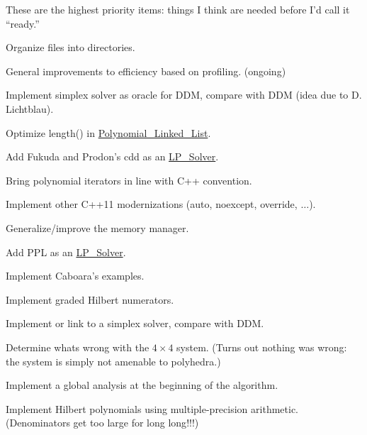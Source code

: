 
\begin{DoxyRefList}
\item[\label{todo__todo000001}%
\Hypertarget{todo__todo000001}%
page \hyperlink{index}{Dyn\+GB\+: Dynamic Gr\"{o}bner basis project files} ]These are the highest priority items\+: things I think are needed before I'd call it ``ready.''
\begin{DoxyItemize}
\item Organize files into directories.
\item General improvements to efficiency based on profiling. (ongoing)
\item Implement simplex solver as oracle for D\+DM, compare with D\+DM (idea due to D. Lichtblau).
\item Optimize length() in \hyperlink{group__polygroup_class_polynomial___linked___list}{Polynomial\+\_\+\+Linked\+\_\+\+List}.
\item Add Fukuda and Prodon's cdd as an \hyperlink{group___c_l_s_solvers_class_l_p___solver}{L\+P\+\_\+\+Solver}. \cite{Fukuda_DoubleDescriptionRevisited}
\item Bring polynomial iterators in line with C++ convention.
\item Implement other C++11 modernizations ({\ttfamily auto}, {\ttfamily noexcept}, {\ttfamily override}, {$\dots$}).
\item Generalize/improve the memory manager.
\item Add P\+PL as an \hyperlink{group___c_l_s_solvers_class_l_p___solver}{L\+P\+\_\+\+Solver}. \cite{BagnaraHZ08SCP}
\item Implement Caboara's examples.
\item Implement graded Hilbert numerators.
\item Implement or link to a simplex solver, compare with D\+DM.
\item Determine what\textquotesingle{}s wrong with the $4\times4$ system. (Turns out nothing was wrong\+: the system is simply not amenable to polyhedra.)
\item Implement a global analysis at the beginning of the algorithm.
\item Implement Hilbert polynomials using multiple-\/precision arithmetic. (Denominators get too large for {\ttfamily long long}!!!)
\end{DoxyItemize}


\end{DoxyRefList}
